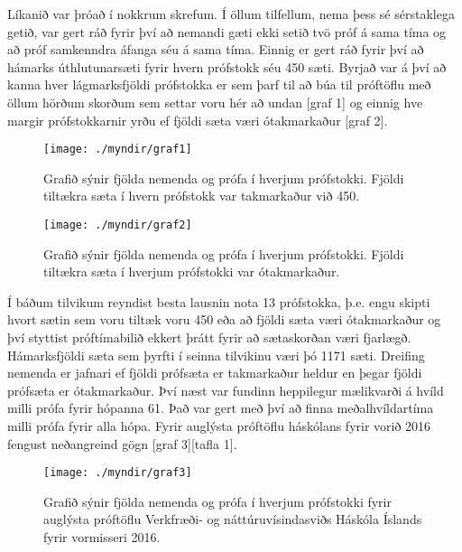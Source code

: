 \documentclass[12pt]{article}
\begin{document}
Líkanið var þróað í nokkrum skrefum. Í öllum tilfellum, nema þess sé sérstaklega getið, var gert ráð fyrir því að nemandi gæti ekki setið tvö próf á sama tíma og að próf samkenndra áfanga séu á sama tíma. Einnig er gert ráð fyrir því að hámarks úthlutunarsæti fyrir hvern prófstokk séu 450 sæti.
Byrjað var á því að kanna hver lágmarksfjöldi prófstokka er sem þarf til að búa til próftöflu með öllum hörðum skorðum sem settar voru hér að undan [graf 1] og einnig hve margir prófstokkarnir yrðu ef fjöldi sæta væri ótakmarkaður [graf 2]. 


\begin{figure}[h]
\centering
\texttt{[image: ./myndir/graf1]}
\caption{Grafið sýnir fjölda nemenda og prófa í hverjum prófstokki. Fjöldi tiltækra sæta í hvern prófstokk var takmarkaður við 450.}
\end{figure}

\begin{figure}[h]
    \centering
    \texttt{[image: ./myndir/graf2]}
    \caption{Grafið sýnir fjölda nemenda og prófa í hverjum prófstokki. Fjöldi tiltækra sæta í hverjum prófstokki var ótakmarkaður.}
\end{figure}





Í báðum tilvikum reyndist besta lausnin nota 13 prófstokka, þ.e. engu skipti hvort sætin sem voru tiltæk voru 450 eða að fjöldi sæta væri ótakmarkaður og því styttist próftímabilið ekkert þrátt fyrir að sætaskorðan væri fjarlægð. Hámarksfjöldi sæta sem þyrfti í seinna tilvikinu væri þó 1171 sæti. Dreifing nemenda er jafnari ef fjöldi prófsæta er takmarkaður heldur en þegar fjöldi prófsæta er ótakmarkaður. 
Því næst var fundinn heppilegur mælikvarði á hvíld milli prófa fyrir hópanna 61. Það var gert með því að finna meðalhvíldartíma milli prófa fyrir alla hópa. Fyrir auglýsta próftöflu háskólans fyrir vorið 2016 fengust neðangreind gögn  [graf 3][tafla 1].


\begin{figure}[h]
    \centering
    \texttt{[image: ./myndir/graf3]}
    \caption{Grafið sýnir fjölda nemenda og prófa í hverjum prófstokki fyrir auglýsta próftöflu Verkfræði- og náttúruvísindasviðs Háskóla Íslands fyrir vormisseri 2016.}
\end{figure}
\end{document}
